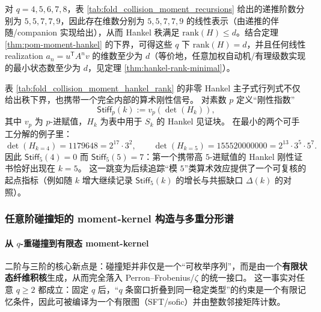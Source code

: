 \begin{corollary}\label{cor:pom-moment-minreal}
对 \(q=4,5,6,7,8\)，表 \ref{tab:fold_collision_moment_recursions} 给出的递推阶数分别为 \(5,5,7,7,9\)，因此存在维数分别为 \(5,5,7,7,9\) 的线性表示（由递推的伴随/companion 实现给出），从而 Hankel 秩满足 \(\mathrm{rank}(H)\le d\)。结合定理 \ref{thm:pom-moment-hankel} 的下界，可得这些 \(q\) 下 \(\mathrm{rank}(H)=d\)，并且任何线性 realization \(a_n=u^{\mathsf T}A^n v\) 的维数至少为 \(d\)（等价地，任意加权自动机/有理级数实现的最小状态数至少为 \(d\)，见定理 \ref{thm:hankel-rank-minimal}）。
\end{corollary}



\begin{remark}[\texorpdfstring{$p$}{p}-进刚性指纹：\texorpdfstring{$p=5$}{p=5} 在 \texorpdfstring{$k=5$}{k=5} 的 Hankel 证书中首次显性出现]\label{rem:pom-hankel-stiffness-p5}
表 \ref{tab:fold_collision_moment_hankel_rank} 的非零 Hankel 主子式行列式不仅给出秩下界，也携带一个完全内部的算术刚性信号。
对素数 \(p\) 定义“刚性指数”
\[
\mathsf{Stiff}_p(k):=v_p(\det(H_k)),
\]
其中 \(v_p\) 为 \(p\)-进赋值，\(H_k\) 为表中用于 \(S_k\) 的 Hankel 见证块。
在最小的两个可手工分解的例子里：
\[
\det(H_{k=4})=1179648=2^{17}\cdot 3^2,
\qquad
\det(H_{k=5})=155520000000=2^{13}\cdot 3^5\cdot 5^7.
\]
因此 \(\mathsf{Stiff}_5(4)=0\) 而 \(\mathsf{Stiff}_5(5)=7\)：第一个携带高 \(5\)-进赋值的 Hankel 刚性证书恰好出现在 \(k=5\)。
这一跳变为后续追踪“模 \(5\)”类算术效应提供了一个可复核的起点指标（例如随 \(k\) 增大继续记录 \(\mathsf{Stiff}_5(k)\) 的增长与共振缺口 \(\Delta(k)\) 的对照）。
\end{remark}

\subsubsection{任意阶碰撞矩的 moment-kernel 构造与多重分形谱}\label{subsec:pom-moment-general}

\paragraph{从 \texorpdfstring{$q$}{q}-重碰撞到有限态 moment-kernel}
二阶与三阶的核心新点是：碰撞矩并非仅是一个“可枚举序列”，而是由一个\textbf{有限状态纤维积核}生成，从而完全落入 Perron--Frobenius/\(\zeta\) 的统一接口。
这一事实对任意 \(q\ge 2\) 都成立：固定 \(q\) 后，“\(q\) 条窗口折叠到同一稳定类型”的约束是一个有限记忆条件，因此可被编译为一个有限图（SFT/sofic）并由整数邻接矩阵计数。

